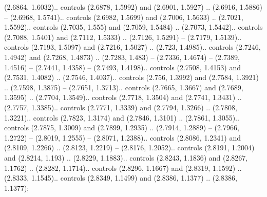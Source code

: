 (2.6864, 1.6032).. controls (2.6878, 1.5992) and (2.6901, 1.5927) .. (2.6916, 1.5886) -- (2.6968, 1.5741).. controls (2.6982, 1.5699) and (2.7006, 1.5633) .. (2.7021, 1.5592).. controls (2.7035, 1.555) and (2.7059, 1.5484) .. (2.7073, 1.5442).. controls (2.7088, 1.5401) and (2.7112, 1.5333) .. (2.7126, 1.5291) -- (2.7179, 1.5139).. controls (2.7193, 1.5097) and (2.7216, 1.5027) .. (2.723, 1.4985).. controls (2.7246, 1.4942) and (2.7268, 1.4873) .. (2.7283, 1.483) -- (2.7336, 1.4674) -- (2.7389, 1.4516) -- (2.7441, 1.4358) -- (2.7493, 1.4198).. controls (2.7508, 1.4153) and (2.7531, 1.4082) .. (2.7546, 1.4037).. controls (2.756, 1.3992) and (2.7584, 1.3921) .. (2.7598, 1.3875) -- (2.7651, 1.3713).. controls (2.7665, 1.3667) and (2.7689, 1.3595) .. (2.7704, 1.3549).. controls (2.7718, 1.3504) and (2.7741, 1.3431) .. (2.7757, 1.3385).. controls (2.7771, 1.3339) and (2.7794, 1.3266) .. (2.7808, 1.3221).. controls (2.7823, 1.3174) and (2.7846, 1.3101) .. (2.7861, 1.3055).. controls (2.7875, 1.3009) and (2.7899, 1.2935) .. (2.7914, 1.2889) -- (2.7966, 1.2722) -- (2.8019, 1.2555) -- (2.8071, 1.2388).. controls (2.8086, 1.2341) and (2.8109, 1.2266) .. (2.8123, 1.2219) -- (2.8176, 1.2052).. controls (2.8191, 1.2004) and (2.8214, 1.193) .. (2.8229, 1.1883).. controls (2.8243, 1.1836) and (2.8267, 1.1762) .. (2.8282, 1.1714).. controls (2.8296, 1.1667) and (2.8319, 1.1592) .. (2.8333, 1.1545).. controls (2.8349, 1.1499) and (2.8386, 1.1377) .. (2.8386, 1.1377);



